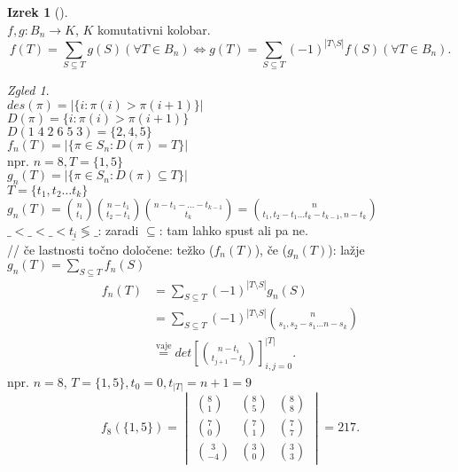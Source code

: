 \documentclass[a4paper, 12pt]{book}
\theoremstyle{definition}
\newtheorem{theorem}[counter]{Izrek}
\theoremstyle{remark}
\newtheorem*{exmp}{Zgled}
\begin{document}
\begin{theorem}[] \text{} \\
  $f, g: B_n \to K$, $K$ komutativni kolobar.
  \begin{equation*}f(T) = \sum_{S \subseteq T} g(S) (\forall T \in B_n) \iff
    g(T) = \sum_{S \subseteq T} (-1)^{|T \setminus S|} f(S) (\forall T \in B_n).
  \end{equation*}
\end{theorem}
\begin{exmp} \text{} \\
  $des(\pi) = |\{i : \pi(i) > \pi(i+1)\}|$ \\
  $D(\pi) = \{i : \pi(i) > \pi(i+1)\}$ \\
  $D(1\;4\;2\;6\;5\;3) = \{2,4,5\}$ \\
  $f_n(T) = |\{\pi \in S_n: D(\pi) = T\}|$ \\
  npr. $n=8, T=\{1,5\}$ \\
  $g_n(T) = |\{\pi \in S_n: D(\pi) \subseteq T\}|$ \\
  $T = \{t_1, t_2 \dots t_k\}$ \\
  $g_n(T) = \binom{n}{t_1} \binom{n-t_1}{t_2-t_1} \binom{n-t_1-\dots-t_{k-1}}{t_k}
    = \binom{n}{t_1,t_2-t_1 \dots t_k-t_{k-1}, n-t_k}$ \\
  $\_ < \_ < \_ < \underline{t_i} \lessgtr \_$: zaradi $\subseteq$: tam lahko spust ali pa ne. \\
  // če lastnosti točno določene: težko ($f_n(T)$), če  ($g_n(T)$): lažje \\
  $g_n(T) = \sum_{S \subseteq T} f_n(S)$ \\
  \begin{align*}
    f_n(T) &= \sum_{S \subseteq T} (-1)^{|T \setminus S|} g_n(S) \\
    &= \sum_{S \subseteq T} (-1)^{|T \setminus S|} \binom{n}{s_1, s_2-s_1 \dots n-s_k} \\
    &\stackrel{\text{vaje}}{=} det\left[\binom{n-t_i}{t_{j+1}-t_j}\right]_{i,j=0}^{|T|}.
  \end{align*}
  npr. $n=8$, $T=\{1,5\}, t_0=0, t_{|T|}=n+1=9$
  \begin{equation*}
    f_8(\{1,5\}) = \begin{vmatrix}
      \binom{8}{1} & \binom{8}{5} & \binom{8}{8} \\
      \binom{7}{0} & \binom{7}{1} & \binom{7}{7} \\
      \binom{3}{-4} & \binom{3}{0} & \binom{3}{3}
    \end{vmatrix} = 217.
  \end{equation*}
\end{exmp}
\end{document}
